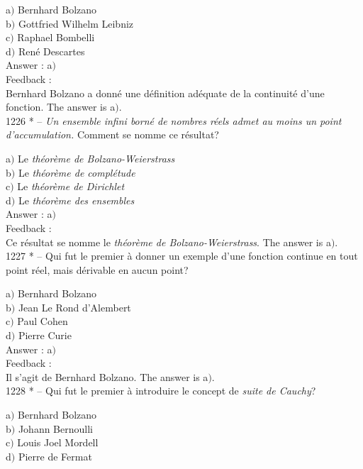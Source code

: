 ﻿\documentclass[letterpaper, 12pt]{article}
\begin{document}
a$)$ Bernhard Bolzano \\
b$)$ Gottfried Wilhelm Leibniz \\
c$)$ Raphael Bombelli \\
d$)$ Ren\'e Descartes\\

Answer : a$)$\\

Feedback : \\
Bernhard Bolzano a donn\'e une d\'efinition ad\'equate de la
continuit\'e d'une fonction.
The answer is a$)$.\\

1226 * -- {\sl Un ensemble infini born\'e de nombres r\'eels admet
au moins un point d'accumulation.} Comment se nomme ce r\'esultat?

a$)$ Le {\sl th\'eor\`eme de Bolzano-Weierstrass} \\
b$)$ Le {\sl th\'eor\`eme de compl\'etude} \\
c$)$ Le {\sl th\'eor\`eme de Dirichlet} \\
d$)$ Le {\sl th\'eor\`eme des ensembles}\\

Answer : a$)$\\

Feedback : \\
Ce r\'esultat se nomme le {\sl th\'eor\`eme de Bolzano-Weierstrass}.
The answer is a$)$.\\

1227 * -- Qui fut le premier \`a donner un exemple d'une fonction
continue en tout point r\'eel, mais d\'erivable en aucun point?

a$)$ Bernhard Bolzano \\
b$)$ Jean Le Rond d'Alembert \\
c$)$ Paul Cohen \\
d$)$ Pierre Curie\\

Answer : a$)$\\

Feedback : \\
Il s'agit de Bernhard Bolzano.
The answer is a$)$.\\

1228 * -- Qui fut le premier \`a introduire le concept de {\sl suite
de Cauchy}?

a$)$ Bernhard Bolzano \\
b$)$ Johann Bernoulli \\
c$)$ Louis Joel Mordell \\
d$)$ Pierre de Fermat\\
\end{document}
